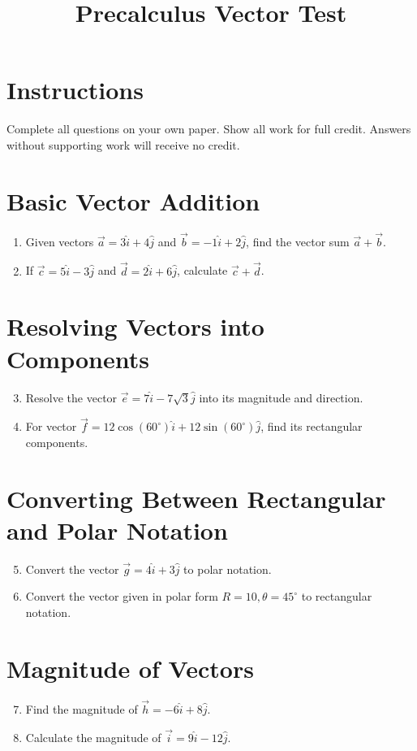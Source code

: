 \documentclass{article}
\title{Precalculus Vector Test}
\date{}
\begin{document}
\maketitle

\section*{Instructions}
Complete all questions on your own paper. Show all work for full credit. Answers without supporting work will receive no credit.

\section*{Basic Vector Addition}
\begin{enumerate}
    \item Given vectors $\vec{a} = 3\hat{i} + 4\hat{j}$ and $\vec{b} = -1\hat{i} + 2\hat{j}$, find the vector sum $\vec{a} + \vec{b}$.
    \item If $\vec{c} = 5\hat{i} - 3\hat{j}$ and $\vec{d} = 2\hat{i} + 6\hat{j}$, calculate $\vec{c} + \vec{d}$.
\end{enumerate}

\section*{Resolving Vectors into Components}
\begin{enumerate}
    \setcounter{enumi}{2}
    \item Resolve the vector $\vec{e} = 7\hat{i} - 7\sqrt{3}\hat{j}$ into its magnitude and direction.
    \item For vector $\vec{f} = 12\cos(60^\circ)\hat{i} + 12\sin(60^\circ)\hat{j}$, find its rectangular components.
\end{enumerate}

\section*{Converting Between Rectangular and Polar Notation}
\begin{enumerate}
    \setcounter{enumi}{4}
    \item Convert the vector $\vec{g} = 4\hat{i} + 3\hat{j}$ to polar notation.
    \item Convert the vector given in polar form $R = 10, \theta = 45^\circ$ to rectangular notation.
\end{enumerate}

\section*{Magnitude of Vectors}
\begin{enumerate}
    \setcounter{enumi}{6}
    \item Find the magnitude of $\vec{h} = -6\hat{i} + 8\hat{j}$.
    \item Calculate the magnitude of $\vec{i} = 9\hat{i} - 12\hat{j}$.
\end{enumerate}
\end{document}
